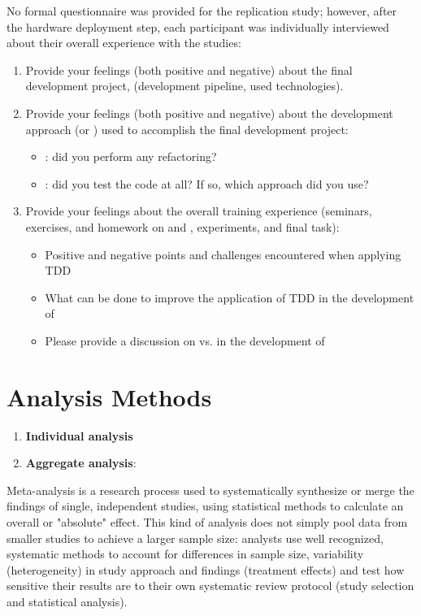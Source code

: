 \noindent No formal questionnaire was provided for the replication study; however, after the hardware deployment step, each participant was individually interviewed about their overall experience with the studies:
\begin{enumerate}
    \item Provide your feelings (both positive and negative) about the final development project, (\eg development pipeline, used technologies).
    \item Provide your feelings (both positive and negative) about the development approach (\ie \tdd or \notdd) used to accomplish the final development project:
        \begin{itemize}
            \item \tdd: did you perform any refactoring? 
            \item \notdd: did you test the code at all? If so, which approach did you use?
        \end{itemize}
    \item Provide your feelings about the overall training experience (seminars, exercises, and homework on \tdd and \notdd, experiments, and final task):
        \begin{itemize}
            \item Positive and negative points and challenges encountered when applying TDD
            \item What can be done to improve the application of TDD in the development of \ess
            \item Please provide a discussion on \tdd vs. \notdd in the development of \ess
        \end{itemize}
\end{enumerate}
 




\section{Analysis Methods}
\begin{enumerate}
    \item \textbf{Individual analysis}
    \item \textbf{Aggregate analysis}:
\end{enumerate}
Meta-analysis is a research process used to systematically synthesize or merge the findings of single, independent studies, using statistical methods to calculate an overall or "absolute" effect. This kind of analysis does not simply pool data from smaller studies to achieve a larger sample size: analysts use well recognized, systematic methods to account for differences in sample size, variability (heterogeneity) in study approach and findings (treatment effects) and test how sensitive their results are to their own systematic review protocol (study selection and statistical analysis).




